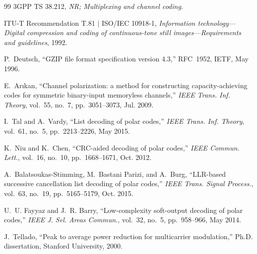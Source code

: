 \documentclass[11pt,a4paper]{article}
\theoremstyle{remark}
\begin{document}
\begin{thebibliography}{99}
3GPP TS 38.212, \emph{NR; Multiplexing and channel coding}.

ITU-T Recommendation T.81 $|$ ISO/IEC 10918-1, \emph{Information technology---Digital compression and coding of continuous-tone still images---Requirements and guidelines}, 1992.

P.~Deutsch, ``GZIP file format specification version 4.3,'' RFC~1952, IETF, May 1996.

E.~Ar{\i}kan, ``Channel polarization: a method for constructing capacity-achieving codes for symmetric binary-input memoryless channels,'' \emph{IEEE Trans. Inf. Theory}, vol.~55, no.~7, pp.~3051--3073, Jul. 2009.

I.~Tal and A.~Vardy, ``List decoding of polar codes,'' \emph{IEEE Trans. Inf. Theory}, vol.~61, no.~5, pp.~2213--2226, May 2015.

K.~Niu and K.~Chen, ``CRC-aided decoding of polar codes,'' \emph{IEEE Commun. Lett.}, vol.~16, no.~10, pp.~1668--1671, Oct. 2012.

A.~Balatsoukas-Stimming, M.~Bastani Parizi, and A.~Burg, ``LLR-based successive cancellation list decoding of polar codes,'' \emph{IEEE Trans. Signal Process.}, vol.~63, no.~19, pp.~5165--5179, Oct. 2015.

U.~U. Fayyaz and J.~R. Barry, ``Low-complexity soft-output decoding of polar codes,'' \emph{IEEE J. Sel. Areas Commun.}, vol.~32, no.~5, pp.~958--966, May 2014.

J.~Tellado, ``Peak to average power reduction for multicarrier modulation,'' Ph.D. dissertation, Stanford University, 2000.

\end{thebibliography}
\end{document}
